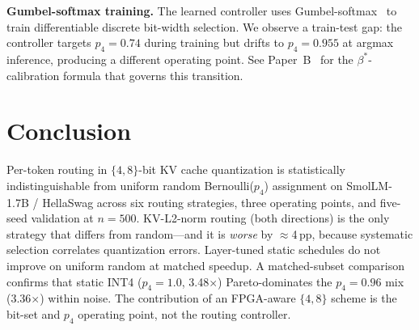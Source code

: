 \documentclass{article}
\begin{document}
\textbf{Gumbel-softmax training.} The learned controller uses Gumbel-softmax~\citep{jang2017gumbel}
to train differentiable discrete bit-width selection. We observe a train-test gap: the controller
targets $p_4{=}0.74$ during training but drifts to $p_4{=}0.955$ at argmax inference,
producing a different operating point. See Paper~B~\citep{companion_paper_b} for the
$\beta^*$-calibration formula that governs this transition.

\section{Conclusion}
\label{sec:conclusion}

Per-token routing in $\{4,8\}$-bit KV cache quantization is statistically indistinguishable
from uniform random Bernoulli($p_4$) assignment on SmolLM-1.7B / HellaSwag across six routing
strategies, three operating points, and five-seed validation at $n{=}500$. KV-L2-norm routing
(both directions) is the only strategy that differs from random---and it is \emph{worse} by
$\approx$4\,pp, because systematic selection correlates quantization errors. Layer-tuned static
schedules do not improve on uniform random at matched speedup. A matched-subset comparison
confirms that static INT4 ($p_4{=}1.0$, 3.48$\times$) Pareto-dominates the $p_4{=}0.96$ mix
(3.36$\times$) within noise. The contribution of an FPGA-aware $\{4,8\}$ scheme is the
bit-set and $p_4$ operating point, not the routing controller.



\end{document}
